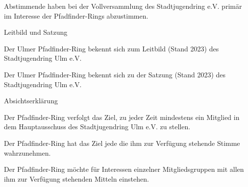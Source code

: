 \begin{legal}
\begin{legal}
\begin{legal}
                    \item Abstimmende haben bei der Vollversammlung des Stadtjugendring e.V. primär 
                          im Interesse der Pfadfinder-Rings abzustimmen.
                \end{legal}
            \item Leitbild und Satzung
                \begin{legal}
                    \item Der Ulmer Pfadfinder-Ring bekennt sich zum Leitbild (Stand 2023) des 
                          Stadtjugendring Ulm e.V.
                    \item Der Ulmer Pfadfinder-Ring bekennt sich zu der Satzung (Stand 2023) des 
                          Stadtjugendring Ulm e.V.
                \end{legal}
        \end{legal}
    \item Absichtserklärung
        \begin{legal}
            \item Der Pfadfinder-Ring verfolgt das Ziel, zu jeder Zeit mindestens ein Mitglied in 
                  dem Hauptausschuss des Stadtjugendring Ulm e.V. zu stellen.
            \item Der Pfadfinder-Ring hat das Ziel jede die ihm zur Verfügung stehende Stimme 
                  wahrzunehmen.
            \item Der Pfadfinder-Ring möchte für Interessen einzelner Mitgliedsgruppen mit allen 
                  ihm zur Verfügung stehenden Mitteln einstehen.
        \end{legal}
\end{legal}
